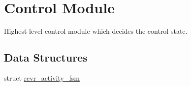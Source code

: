 \hypertarget{group___control}{\section{\-Control \-Module}
\label{group___control}
}


\-Highest level control module which decides the control state.  


\subsection*{\-Data \-Structures}
\begin{DoxyCompactItemize}
\item 
struct \hyperlink{structrcvr__activity__fsm}{rcvr\-\_\-activity\-\_\-fsm}
\end{DoxyCompactItemize}
